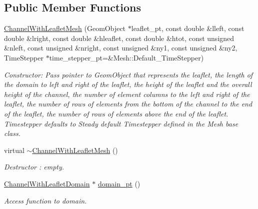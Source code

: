 \subsection*{Public Member Functions}
\begin{DoxyCompactItemize}
\item 
\hyperlink{classoomph_1_1ChannelWithLeafletMesh_ab210be34e9d7f72af9aefee618d41f3d}{Channel\+With\+Leaflet\+Mesh} (Geom\+Object $\ast$leaflet\+\_\+pt, const double \&lleft, const double \&lright, const double \&hleaflet, const double \&htot, const unsigned \&nleft, const unsigned \&nright, const unsigned \&ny1, const unsigned \&ny2, Time\+Stepper $\ast$time\+\_\+stepper\+\_\+pt=\&Mesh\+::\+Default\+\_\+\+Time\+Stepper)
\begin{DoxyCompactList}\small\item\em Constructor\+: Pass pointer to Geom\+Object that represents the leaflet, the length of the domain to left and right of the leaflet, the height of the leaflet and the overall height of the channel, the number of element columns to the left and right of the leaflet, the number of rows of elements from the bottom of the channel to the end of the leaflet, the number of rows of elements above the end of the leaflet. Timestepper defaults to Steady default Timestepper defined in the Mesh base class. \end{DoxyCompactList}\item 
virtual \hyperlink{classoomph_1_1ChannelWithLeafletMesh_ad767dc06cf65becc207f780f8100657c}{$\sim$\+Channel\+With\+Leaflet\+Mesh} ()
\begin{DoxyCompactList}\small\item\em Destructor \+: empty. \end{DoxyCompactList}\item 
\hyperlink{classoomph_1_1ChannelWithLeafletDomain}{Channel\+With\+Leaflet\+Domain} $\ast$ \hyperlink{classoomph_1_1ChannelWithLeafletMesh_a775c95ffa8fb9b7b512fc767528eab22}{domain\+\_\+pt} ()
\begin{DoxyCompactList}\small\item\em Access function to domain. \end{DoxyCompactList}\end{DoxyCompactItemize}
